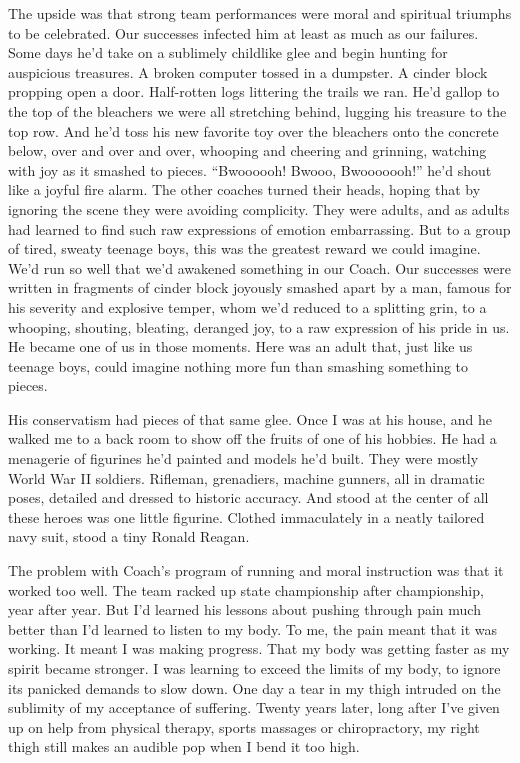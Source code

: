 \documentclass[12pt, oneside]{memoir}
\begin{document}
The upside was that strong team performances were moral and spiritual
triumphs to be celebrated.
Our successes infected him at least as much as our failures.
Some days he'd take on a sublimely childlike glee and begin hunting
for auspicious treasures.
A broken computer tossed in a dumpster.
A cinder block propping open a door.
Half-rotten logs littering the trails we ran.
He'd gallop to the top of the bleachers we were all stretching behind,
lugging his treasure to the top row.
And he'd toss his new favorite toy over the bleachers onto the
concrete below, over and over and over, whooping and cheering and
grinning, watching with joy as it smashed to pieces.
``Bwoooooh! Bwooo, Bwooooooh!'' he'd shout like a joyful fire alarm.
The other coaches turned their heads, hoping that by ignoring the
scene they were avoiding complicity.
They were adults, and as adults had learned to find such raw
expressions of emotion embarrassing.
But to a group of tired, sweaty teenage boys, this was the greatest
reward we could imagine.
We'd run so well that we'd awakened something in our Coach.
Our successes were written in fragments of cinder block joyously
smashed apart by a man, famous for his severity and explosive temper,
whom we'd reduced to a splitting grin, to a whooping, shouting, bleating,
deranged joy, to a raw expression of his pride in us.
He became one of us in those moments.
Here was an adult that, just like us teenage boys, could imagine
nothing more fun than smashing something to pieces.

His conservatism had pieces of that same glee.
Once I was at his house, and he walked me to a back room to show off
the fruits of one of his hobbies.
He had a menagerie of figurines he'd painted and models he'd built.
They were mostly World War II soldiers.
Rifleman, grenadiers, machine gunners, all in dramatic poses, detailed
and dressed to historic accuracy.
And stood at the center of all these heroes was one little figurine.
Clothed immaculately in a neatly tailored navy suit, stood a tiny
Ronald Reagan. 

The problem with Coach's program of running and moral instruction was
that it worked too well.
The team racked up state championship after championship, year after
year.
But I'd learned his lessons about pushing through pain much better
than I'd learned to listen to my body.
To me, the pain meant that it was working.
It meant I was making progress.
That my body was getting faster as my spirit became stronger.
I was learning to exceed the limits of my body, to ignore its panicked
demands to slow down.
One day a tear in my thigh intruded on the sublimity of my acceptance
of suffering.
Twenty years later, long after I've given up on help from physical
therapy, sports massages or chiropractory, my right thigh still makes
an audible pop when I bend it too high.
\end{document}
